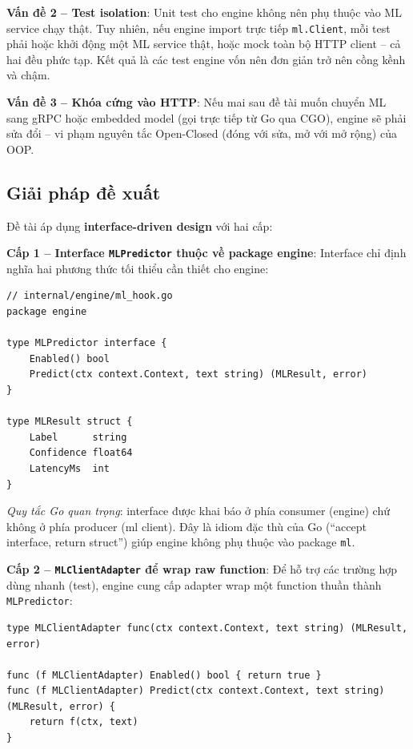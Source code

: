 \documentclass[../DoAn.tex]{subfiles}
\begin{document}
\textbf{Vấn đề 2 -- Test isolation}: Unit test cho engine không nên phụ
thuộc vào ML service chạy thật. Tuy nhiên, nếu engine import trực tiếp
\texttt{ml.Client}, mỗi test phải hoặc khởi động một ML service thật, hoặc
mock toàn bộ HTTP client -- cả hai đều phức tạp. Kết quả là các test
engine vốn nên đơn giản trở nên cồng kềnh và chậm.

\textbf{Vấn đề 3 -- Khóa cứng vào HTTP}: Nếu mai sau đề tài muốn chuyển ML
sang gRPC hoặc embedded model (gọi trực tiếp từ Go qua CGO), engine sẽ
phải sửa đổi -- vi phạm nguyên tắc Open-Closed (đóng với sửa, mở với mở
rộng) của OOP.

\subsection{Giải pháp đề xuất}
\label{subsection:5.4.2}

Đề tài áp dụng \textbf{interface-driven design} với hai cấp:

\textbf{Cấp 1 -- Interface \texttt{MLPredictor} thuộc về package engine}:
Interface chỉ định nghĩa hai phương thức tối thiểu cần thiết cho engine:

\begin{verbatim}
// internal/engine/ml_hook.go
package engine

type MLPredictor interface {
    Enabled() bool
    Predict(ctx context.Context, text string) (MLResult, error)
}

type MLResult struct {
    Label      string
    Confidence float64
    LatencyMs  int
}
\end{verbatim}

\textit{Quy tắc Go quan trọng}: interface được khai báo ở phía consumer
(engine) chứ không ở phía producer (ml client). Đây là idiom đặc thù của
Go (``accept interface, return struct'') giúp engine không phụ thuộc vào
package \texttt{ml}.

\textbf{Cấp 2 -- \texttt{MLClientAdapter} để wrap raw function}: Để hỗ trợ
các trường hợp dùng nhanh (test), engine cung cấp adapter wrap một function
thuần thành \texttt{MLPredictor}:

\begin{verbatim}
type MLClientAdapter func(ctx context.Context, text string) (MLResult, error)

func (f MLClientAdapter) Enabled() bool { return true }
func (f MLClientAdapter) Predict(ctx context.Context, text string) (MLResult, error) {
    return f(ctx, text)
}
\end{verbatim}
\end{document}
